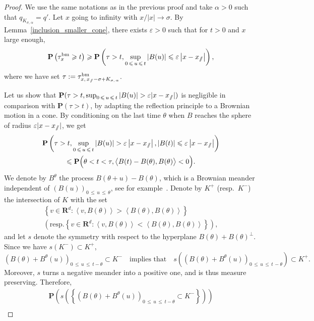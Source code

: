 \documentclass[10pt]{amsart}
\theoremstyle{definition}\newtheorem{defi}[theo]{Definition}\newtheorem{rema}[theo]{Remark}\newtheorem{exam}[theo]{Example}\newtheorem{exem}[theo]{Example}\newtheorem{nota}[theo]{Notation}
\DeclareMathOperator{\bm}{bm}
\newcommand{\pr}{\mathbf{P}}
\newcommand{\bfR}{\mathbf{R}}
\renewcommand{\epsilon}{\varepsilon}
\renewcommand{\leq}{\leqslant}
\renewcommand{\geq}{\geqslant}
\newcommand{\sslash}{\slash\mkern-6.4mu\slash}
\begin{document}
\begin{proof}
We use the same notations as in the previous proof and take $\alpha>0$ such that $q_{K_{\sigma,\,\alpha}}=q'$. Let $x$ going to infinity with $x/| x|\rightarrow \sigma$. By Lemma~\ref{inclusion_smaller_cone}, there exists $\epsilon>0$ such that for $t>0$ and $x$ large enough,
\[
\pr\left(\tau_{x}^{\bm}\geq t\right)\geq \pr\left(\tau>t, \sup_{0\,\leq\,u\,\leq\,t}\left|B(u)\right|\leq \epsilon \left|x-x_{\sslash}\right|\right),
\]
where we have set $\tau:=\tau_{x,\,x_{\sslash}-\sigma+K_{\sigma,\,\alpha}}^{\bm}$.

Let us show that $\pr(\tau>t, \sup_{0\,\leq\,u\,\leq\,t}| B(u)|> \epsilon | x-x_{\sslash}|)$ is negligible in comparison with $\pr(\tau>t)$, by adapting the reflection principle to a Brownian motion in a cone. By conditioning on the last time $\theta$ when $B$ reaches the sphere of radius $\epsilon| x -x_{\sslash}|$, we get
\begin{multline*}
\pr\left(\tau>t, \sup_{0\,\leq\,u\,\leq\,t}|B(u)|> \epsilon \left|x-x_{\sslash}\right|, |B(t)|\leq \epsilon \left|x-x_{\sslash}\right|\right) \\
\leq \pr\Big(\theta<t<\tau, \big\langle B(t)-B(\theta),B(\theta)\big\rangle<0\Big).
\end{multline*}
We denote by $B^{\theta}$ the process $B(\theta+u)-B(\theta)$, which is a Brownian meander independent of $(B(u))_{0\,\leq\,u\,\leq\,\theta}$, see for example~\cite{ReYo-13}. Denote by $K^{+}$ (resp.\ $K^{-}$) the intersection of $K$ with the set
\begin{multline*}
\left\{v\in \bfR^{d}:\left\langle v,B(\theta)\right\rangle >\left\langle B(\theta),B(\theta)\right\rangle\right\}\\
\left(\text{resp.} 
\left\{ v\in \bfR^{d}:\left\langle v,B(\theta)\right\rangle <\left\langle B(\theta),B(\theta)\right\rangle\right\}\right),
\end{multline*}
and let $s$ denote the symmetry with respect to the hyperplane $B(\theta)+B(\theta)^{\perp}$. Since we have $s(K^{-})\subset K^{+}$,
\[
\left(B(\theta)+B^{\theta}(u)\right)_{0\,\leq\,u\,\leq\,t-\theta}\subset K^{-}\quad \text{implies that}\quad s\left(\left(B(\theta)+B^{\theta}(u)\right)_{0\,\leq\,u\,\leq\,t\,-\theta}\right)\subset K^{+}.
\]
Moreover, $s$ turns a negative meander into a positive one, and is thus measure preserving. Therefore,
\begin{multline*}
\pr\left(s\left(\left\{ \left(B(\theta)+B^{\theta}(u)\right)_{0\,\leq\,u\,\leq\,t-\theta}\subset K^{-}\right\}\right)\right)\\

\end{multline*}
\end{proof}
\end{document}
